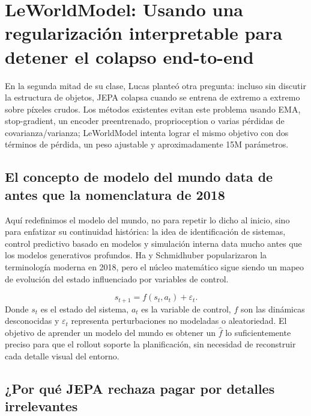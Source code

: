 \section{LeWorldModel: Usando una regularización interpretable para detener el colapso end-to-end}

En la segunda mitad de su clase, Lucas planteó otra pregunta: incluso sin discutir la estructura de objetos, JEPA colapsa cuando se entrena de extremo a extremo sobre píxeles crudos. Los métodos existentes evitan este problema usando EMA, stop-gradient, un encoder preentrenado, proprioception o varias pérdidas de covarianza/varianza; LeWorldModel intenta lograr el mismo objetivo con dos términos de pérdida, un peso ajustable y aproximadamente 15M parámetros.

\subsection{El concepto de modelo del mundo data de antes que la nomenclatura de 2018}

Aquí redefinimos el modelo del mundo, no para repetir lo dicho al inicio, sino para enfatizar su continuidad histórica: la idea de identificación de sistemas, control predictivo basado en modelos y simulación interna data mucho antes que los modelos generativos profundos. Ha y Schmidhuber popularizaron la terminología moderna en 2018, pero el núcleo matemático sigue siendo un mapeo de evolución del estado influenciado por variables de control.


\[
s_{t+1}=f(s_t,a_t)+\varepsilon_t.
\]
Donde $s_t$ es el estado del sistema, $a_t$ es la variable de control, $f$ son las dinámicas desconocidas y $\varepsilon_t$ representa perturbaciones no modeladas o aleatoriedad. El objetivo de aprender un modelo del mundo es obtener un $\hat f$ lo suficientemente preciso para que el rollout soporte la planificación, sin necesidad de reconstruir cada detalle visual del entorno.


\subsection{¿Por qué JEPA rechaza pagar por detalles irrelevantes}

